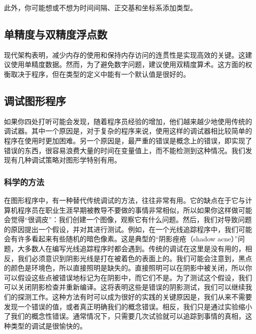 \documentclass[lang=cn,12pt]{elegantbook}
\begin{document}
此外，你可能想或不想为时间间隔、正交基和坐标系添加类型。


\subsection{单精度与双精度浮点数}

现代架构表明，减少内存的使用和保持内存访问的连贯性是实现高效的关键。这建议使用单精度数据。然而，为了避免数字问题，建议使用双精度算术。这方面的权衡取决于程序，但在类型的定义中能有一个默认值是很好的。


\subsection{调试图形程序}

如果你四处打听可能会发现，随着程序员经验的增加，他们越来越少地使用传统的调试器。其中一个原因是，对于复杂的程序来说，使用这样的调试器相比较简单的程序在使用时更加困难。另一个原因是，最严重的错误是概念上的错误，即实现了错误的东西，很容易浪费大量的时间在变量值上，而不能检测到这种情况。我们发现有几种调试策略对图形学特别有用。


\subsubsection{科学的方法}

在图形程序中，有一种替代传统调试的方法，往往非常有用。它的缺点在于它与计算机程序员在职业生涯早期被教导不要做的事情非常相似，所以如果你这样做可能会觉得“很调皮”：我们创建一个图像，观察它有什么问题。然后，我们对导致问题的原因提出一个假设，并对其进行测试。例如，在一个光线追踪程序中，我们可能会有许多看起来有些随机的暗色像素。这是典型的“阴影痤疮（shadow acne）”问题，大多数人在编写光线追踪程序时都会遇到。传统的调试在这里是没有用的，相反，我们必须意识到阴影光线是打在被着色的表面上的。我们可能会注意到，黑点的颜色是环境色，所以直接照明是缺失的。直接照明可以在阴影中被关闭，所以你可以假设这些点被错误地标记为在阴影中，而它们不是。为了测试这个假设，我们可以关闭阴影检查并重新编译。这将表明这些是错误的阴影测试，我们可以继续我们的探测工作。这种方法有时可以成为很好的实践的关键原因是，我们从来不需要发现一个错误的值，或者真正明确我们的概念错误。相反，我们只是通过实验缩小了我们的概念性错误。通常情况下，只需要几次试验就可以追踪到事情的真相，这种类型的调试是很愉快的。
\end{document}
